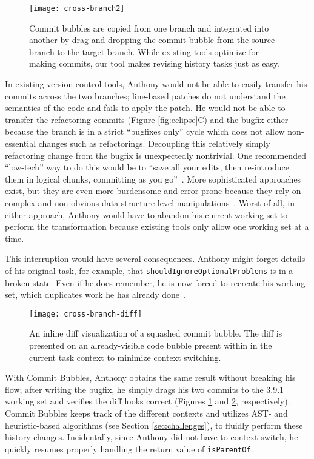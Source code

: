 \documentclass[conference]{IEEEtran}
\begin{document}
\begin{figure}[h]
\centering
\texttt{[image: cross-branch2]}
\caption{Commit bubbles are copied from one branch and integrated into another by drag-and-dropping the commit bubble from the source branch to the target branch.
While existing tools optimize for making commits, our tool makes revising history tasks just as easy.
}
\label{fig:cross-branch}
\end{figure}
In existing version control tools, Anthony would not be able to easily transfer his commits across the two branches;
line-based patches do not understand the semantics of the code and fails to apply the patch.
He would not be able to transfer the refactoring commits (Figure \ref{fig:eclipse}C) and the bugfix either because the branch is in a strict ``bugfixes only'' cycle which does not allow non-essential changes such as refactorings.
Decoupling this relatively simply refactoring change from the bugfix is unexpectedly nontrivial.
One recommended ``low-tech'' way to do this would be to ``save all your edits, then re-introduce them in logical chunks, committing as you go''~\cite{GitBestPractices}.
More sophisticated approaches exist, but they are even more burdensome and error-prone because they rely on complex and non-obvious data structure-level manipulations~\cite{SausageMaking}.
Worst of all, in either approach, Anthony would have to abandon his current working set to perform the transformation because existing tools only allow one working set at a time.

This interruption would have several consequences.
Anthony might forget details of his original task, for example, that \texttt{shouldIgnoreOptionalProblems} is in a broken state.
Even if he does remember, he is now forced to recreate his working set, which duplicates work he has already done~\cite{Ko2006}.

\begin{figure}
\centering
\texttt{[image: cross-branch-diff]}
\caption{An inline diff visualization of a squashed commit bubble. The diff is presented on an already-visible code bubble present within in the current task context to minimize context switching.}
\label{fig:diff}
\end{figure}

With Commit Bubbles, Anthony obtains the same result without breaking his flow; after writing the bugfix, he simply drags his two commits to the 3.9.1 working set and verifies the diff looks correct (Figures \ref{fig:cross-branch} and \ref{fig:diff}, respectively).
Commit Bubbles keeps track of the different contexts and utilizes AST- and heuristic-based algorithms (see Section \ref{sec:challenges}), to fluidly perform these history changes.
Incidentally, since Anthony did not have to context switch, he quickly resumes properly handling the return value of \texttt{isParentOf}.
\end{document}
